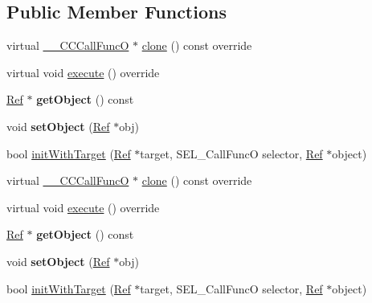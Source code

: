\subsection*{Public Member Functions}
\begin{DoxyCompactItemize}
\item 
virtual \hyperlink{class____CCCallFuncO}{\+\_\+\+\_\+\+C\+C\+Call\+FuncO} $\ast$ \hyperlink{class____CCCallFuncO_ae01d43dd90e3052c278e1431097c2b2e}{clone} () const override
\item 
virtual void \hyperlink{class____CCCallFuncO_aab83cafa03038b765f3752c6f2f307b1}{execute} () override
\item 
\mbox{\label{class____CCCallFuncO_a211793e0feb2d109059357928aa7047d}} 
\hyperlink{classRef}{Ref} $\ast$ {\bfseries get\+Object} () const
\item 
\mbox{\label{class____CCCallFuncO_aa44dc2f0350c0600ab043b9f55dec192}} 
void {\bfseries set\+Object} (\hyperlink{classRef}{Ref} $\ast$obj)
\item 
bool \hyperlink{class____CCCallFuncO_ae295b34998b51d676c97cb71662443bb}{init\+With\+Target} (\hyperlink{classRef}{Ref} $\ast$target, S\+E\+L\+\_\+\+Call\+FuncO selector, \hyperlink{classRef}{Ref} $\ast$object)
\item 
virtual \hyperlink{class____CCCallFuncO}{\+\_\+\+\_\+\+C\+C\+Call\+FuncO} $\ast$ \hyperlink{class____CCCallFuncO_a83119c4b99a7f866556d0e2945ebd61b}{clone} () const override
\item 
virtual void \hyperlink{class____CCCallFuncO_a89e4727ade4f68268afad8040fe08e81}{execute} () override
\item 
\mbox{\label{class____CCCallFuncO_a135e471aa4303ff3d2a4d26b9ef2ce56}} 
\hyperlink{classRef}{Ref} $\ast$ {\bfseries get\+Object} () const
\item 
\mbox{\label{class____CCCallFuncO_aa44dc2f0350c0600ab043b9f55dec192}} 
void {\bfseries set\+Object} (\hyperlink{classRef}{Ref} $\ast$obj)
\item 
bool \hyperlink{class____CCCallFuncO_ae295b34998b51d676c97cb71662443bb}{init\+With\+Target} (\hyperlink{classRef}{Ref} $\ast$target, S\+E\+L\+\_\+\+Call\+FuncO selector, \hyperlink{classRef}{Ref} $\ast$object)
\end{DoxyCompactItemize}
